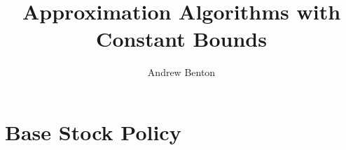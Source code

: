 \documentclass[12pt]{report}
\title{Approximation Algorithms with Constant Bounds}
\author{Andrew Benton}
\begin{document}
\maketitle

\section{Base Stock Policy}
\end{document}
